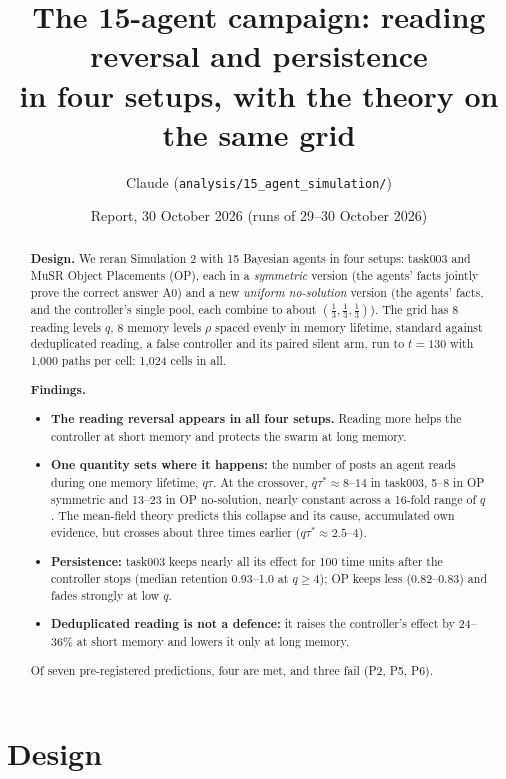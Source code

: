 \documentclass[10pt,a4paper]{article}
\title{\textbf{The 15-agent campaign: reading reversal and persistence}\\[2pt]
\large in four setups, with the theory on the same grid}
\author{Claude (\nolinkurl{analysis/15_agent_simulation/})}
\date{Report, 30 October 2026 (runs of 29--30 October 2026)}
\begin{document}
\maketitle

\begin{abstract}
\noindent
\textbf{Design.} We reran Simulation 2 with 15 Bayesian agents in four setups: task003 and MuSR Object Placements (OP),
each in a \emph{symmetric} version (the agents' facts jointly prove the correct answer A0) and a new \emph{uniform
no-solution} version (the agents' facts, and the controller's single pool, each combine to about $(\tfrac13,\tfrac13,
\tfrac13)$). The grid has 8 reading levels $q$, 8 memory levels $\rho$ spaced evenly in memory lifetime, standard
against deduplicated reading, a false controller and its paired silent arm, run to $t=130$ with 1,000 paths per cell:
1,024 cells in all.

\textbf{Findings.}
\begin{itemize}
\item \textbf{The reading reversal appears in all four setups.} Reading more helps the controller at short memory and
  protects the swarm at long memory.
\item \textbf{One quantity sets where it happens:} the number of posts an agent reads during one memory lifetime,
  $q\tau$. At the crossover, $q\tau^*\approx 8$--$14$ in task003, 5--8 in OP symmetric and 13--23 in OP no-solution,
  nearly constant across a 16-fold range of $q$. The mean-field theory predicts this collapse and its cause, accumulated
  own evidence, but crosses about three times earlier ($q\tau^*\approx2.5$--$4$).
\item \textbf{Persistence:} task003 keeps nearly all its effect for 100 time units after the controller stops (median
  retention 0.93--1.0 at $q\ge4$); OP keeps less (0.82--0.83) and fades strongly at low $q$.
\item \textbf{Deduplicated reading is not a defence:} it raises the controller's effect by 24--36\% at short memory and
  lowers it only at long memory.
\end{itemize}
Of seven pre-registered predictions, four are met, and three fail (P2, P5, P6).
\end{abstract}

\tableofcontents
\clearpage

\section{Design}
\label{sec:design}
\end{document}

